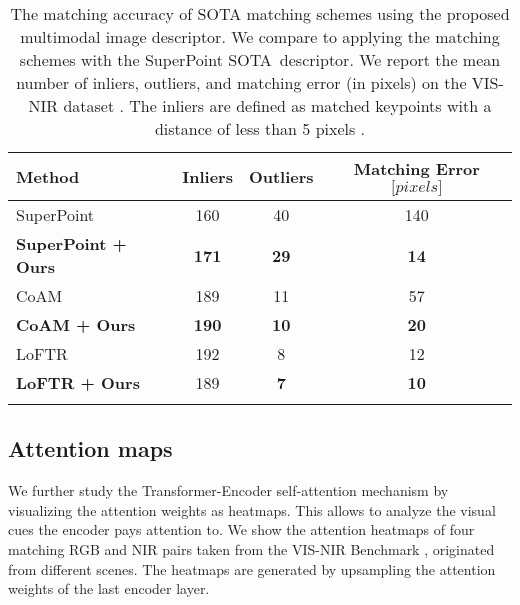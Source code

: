 \documentclass[10pt,journal]{IEEEtran}\usepackage{amsfonts}
\begin{document}
\begin{table*}[tbh]
\centering
\par
\begin{tabular}{lccc}
\toprule Method & Inliers & Outliers & \makecell{Matching Error\\ $\bigl[
pixels \bigr]$} \\
\midrule SuperPoint\cite{SuperPoint} & 160 & 40 & 140 \\
\textbf{SuperPoint\cite{SuperPoint} + Ours} & \textbf{171} & \textbf{29} &
\textbf{14} \\
CoAM\cite{CoAM} & 189 & 11 & 57 \\
\textbf{CoAM\cite{CoAM} + Ours} & \textbf{190} & \textbf{10} & \textbf{20}
\\
LoFTR\cite{LoFTR} & 192 & 8 & 12 \\
\textbf{LoFTR\cite{LoFTR} + Ours} & 189 & \textbf{7} & \textbf{10} \\
\bottomrule &  &  &
\end{tabular}\caption{The matching accuracy of SOTA matching schemes using the proposed
multimodal image descriptor. We compare to applying the matching schemes
with the SuperPoint \protect\cite{SuperPoint} SOTA\ descriptor. We report
the mean number of inliers, outliers, and matching error (in pixels) on the
VIS-NIR dataset \protect\cite{SiameseCrossSpectral}. The inliers are defined
as matched keypoints with a distance of less than 5 pixels \protect\cite {multisensor}.}
\label{tab:image_matching}
\end{table*}

\subsection{Attention maps}

\label{subsec:Attention maps}

We further study the Transformer-Encoder self-attention mechanism by
visualizing the attention weights as heatmaps. This allows to analyze the
visual cues the encoder pays attention to. We show the attention heatmaps of
four matching RGB and NIR pairs taken from the VIS-NIR Benchmark \cite {SiameseCrossSpectral}, originated from different scenes. The heatmaps are
generated by upsampling the attention weights of the last encoder layer.
\end{document}
